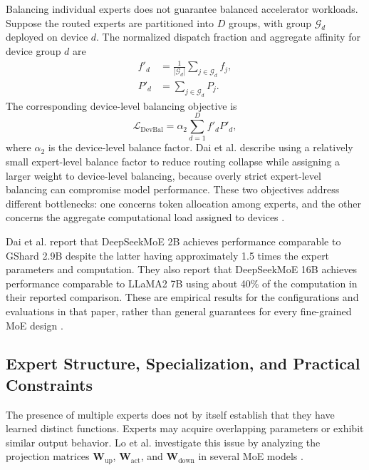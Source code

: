Balancing individual experts does not guarantee balanced accelerator
workloads. Suppose the routed experts are partitioned into \(D\) groups,
with group \(\mathcal{G}_d\) deployed on device \(d\). The normalized
dispatch fraction and aggregate affinity for device group \(d\) are
\begin{align}
    f'_d
    &=
    \frac{1}{|\mathcal{G}_d|}
    \sum_{j\in\mathcal{G}_d}f_j,
    \label{eq:deepseek-device-dispatch}\\
    P'_d
    &=
    \sum_{j\in\mathcal{G}_d}P_j.
    \label{eq:deepseek-device-affinity}
\end{align}
The corresponding device-level balancing objective is
\begin{equation}
    \mathcal{L}_{\mathrm{DevBal}}
    =
    \alpha_2
    \sum_{d=1}^{D}f'_dP'_d,
    \label{eq:deepseek-device-balance}
\end{equation}
where \(\alpha_2\) is the device-level balance factor. Dai et al.
describe using a relatively small expert-level balance factor to
reduce routing collapse while assigning a larger weight to
device-level balancing, because overly strict expert-level balancing
can compromise model performance. These two objectives address
different bottlenecks: one concerns token allocation among experts,
and the other concerns the aggregate computational load assigned
to devices \parencite{dai2024deepseekmoe}.

Dai et al. report that DeepSeekMoE 2B achieves performance comparable
to GShard 2.9B despite the latter having approximately 1.5 times the
expert parameters and computation. They also report that DeepSeekMoE
16B achieves performance comparable to LLaMA2 7B using about 40\%
of the computation in their reported comparison. These are empirical
results for the configurations and evaluations in that paper, rather
than general guarantees for every fine-grained MoE design
\parencite{dai2024deepseekmoe}.

\subsection{Expert Structure, Specialization, and Practical Constraints}
\label{subsec:ffn-expert-analysis}

The presence of multiple experts does not by itself establish that
they have learned distinct functions. Experts may acquire overlapping
parameters or exhibit similar output behavior. Lo et al. investigate
this issue by analyzing the projection matrices
\(\mathbf{W}_{\mathrm{up}}\),
\(\mathbf{W}_{\mathrm{act}}\), and
\(\mathbf{W}_{\mathrm{down}}\) in several MoE models
\parencite{lo2025closer}.

